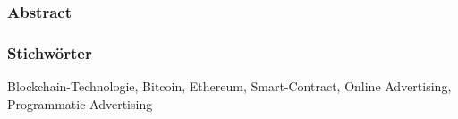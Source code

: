\subsubsection{Abstract}

\subsubsection{Stichwörter}
Blockchain-Technologie, Bitcoin, Ethereum, Smart-Contract, Online Advertising, Programmatic Advertising